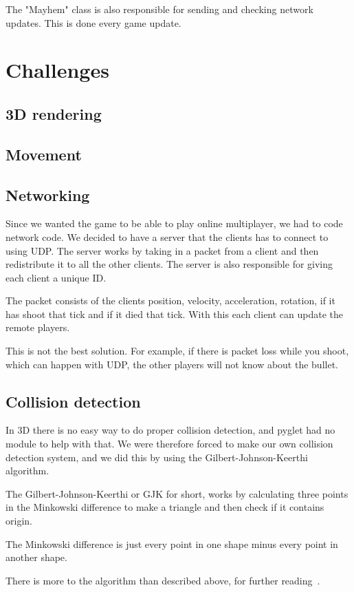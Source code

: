 \documentclass[journal]{IEEEtran}
\begin{document}
The "Mayhem" class is also responsible for sending and checking network updates. This is done every game update.
\section{Challenges}\label{Section:Challenges}
\subsection{3D rendering}
\subsection{Movement}
\subsection{Networking}
Since we wanted the game to be able to play online multiplayer, we had to code network code.
We decided to have a server that the clients has to connect to using UDP. The server works by taking in a packet from a client and then redistribute it to all the other clients. The server is also responsible for giving each client a unique ID.

The packet consists of the clients position, velocity, acceleration, rotation, if it has shoot that tick and if it died that tick. With this each client can update the remote players.

This is not the best solution. For example, if there is packet loss while you shoot, which can happen with UDP, the other players will not know about the bullet.
\subsection{Collision detection}
In 3D there is no easy way to do proper collision detection, and pyglet had no module to help with that. We were therefore forced to make our own collision detection system, and we did this by using the Gilbert-Johnson-Keerthi algorithm. 

The Gilbert-Johnson-Keerthi or GJK for short, works by calculating three points in the Minkowski difference to make a triangle and then check if it contains origin.~\cite{wikipediaGilbertJohnsonKeerthiDistance}

The Minkowski difference is just every point in one shape minus every point in another shape.~\cite{wikipediaMinkowskiAddition}

There is more to the algorithm than described above, for further reading~\cite{wikipediaGilbertJohnsonKeerthiDistance}.
\end{document}
